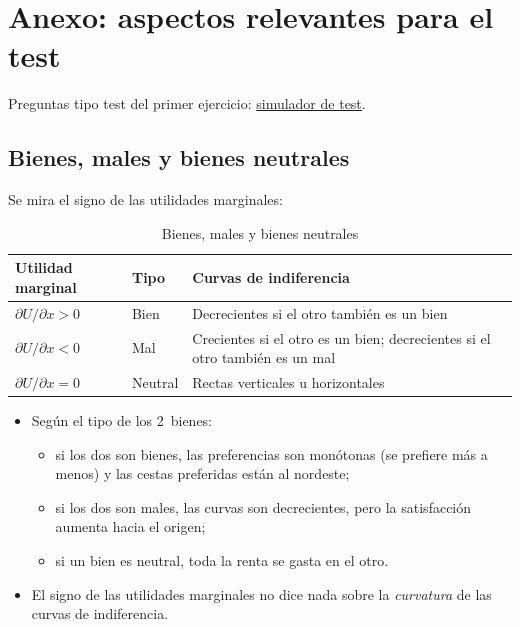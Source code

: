\documentclass[11pt]{article}
\begin{document}
\section{Anexo: aspectos relevantes para el test}\label{anexo:test}

\begin{anotaciones}
Preguntas tipo test del primer ejercicio: \href{https://www.victorgutierrezmarcos.es/oposicion/temario/primer-ejercicio/test/simulador.html?tema=3.A.8}{simulador de test}.
\end{anotaciones}

\subsection{Bienes, males y bienes neutrales}\label{anexo:bienes-males-bienes}

Se mira el signo de las utilidades marginales:
\begin{table}[H]
\centering\small
\caption{Bienes, males y bienes neutrales}\label{tab:bienes-males}
\begin{tabular}{@{}lll@{}}
\toprule
\textbf{Utilidad marginal} & \textbf{Tipo} & \textbf{Curvas de indiferencia} \\
\midrule
$\partial U/\partial x>0$ & Bien & Decrecientes si el otro también es un bien \\
$\partial U/\partial x<0$ & Mal & Crecientes si el otro es un bien; decrecientes si el otro también es un mal \\
$\partial U/\partial x=0$ & Neutral & Rectas verticales u horizontales \\
\bottomrule
\end{tabular}
\end{table}
\begin{itemize}
\item Según el tipo de los 2~bienes:
  \begin{itemize}
  \item si los dos son bienes, las preferencias son monótonas (se prefiere más a menos) y las cestas preferidas están al nordeste;
  \item si los dos son males, las curvas son decrecientes, pero la satisfacción aumenta hacia el origen;
  \item si un bien es neutral, toda la renta se gasta en el otro.
  \end{itemize}
\item El signo de las utilidades marginales no dice nada sobre la \emph{curvatura} de las curvas de indiferencia.
\end{itemize}
\end{document}
